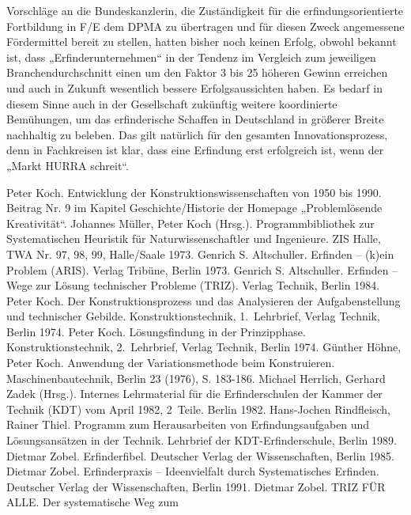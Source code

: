\documentclass[11pt,a4paper]{article}
\begin{document}
Vorschläge an die Bundeskanzlerin, die Zuständigkeit für die
erfindungsorientierte Fortbildung in F/E dem DPMA zu übertragen und für diesen
Zweck angemessene Fördermittel bereit zu stellen, hatten bisher noch keinen
Erfolg, obwohl bekannt ist, dass „Erfinderunternehmen“ in der Tendenz im
Vergleich zum jeweiligen Branchendurchschnitt einen um den Faktor 3 bis 25
höheren Gewinn erreichen und auch in Zukunft wesentlich bessere
Erfolgsaussichten haben. Es bedarf in diesem Sinne auch in der Gesellschaft
zukünftig weitere koordinierte Bemühungen, um das erfinderische Schaffen in
Deutschland in größerer Breite nachhaltig zu beleben. Das gilt natürlich für
den gesamten Innovationsprozess, denn in Fachkreisen ist klar, dass eine
Erfindung erst erfolgreich ist, wenn der „Markt HURRA schreit“.

\begin{thebibliography}{xxx}
 Peter Koch. Entwicklung der Konstruktionswissenschaften von 1950
  bis 1990. Beitrag Nr. 9 im Kapitel Geschichte/Historie der Homepage
  „Problemlösende Kreativität“.
 Johannes Müller, Peter Koch (Hrsg.). Programmbibliothek zur
  Systematischen Heuristik für Naturwissenschaftler und Ingenieure. ZIS Halle,
  TWA Nr. 97, 98, 99, Halle/Saale 1973.
 Genrich S. Altschuller. Erfinden -- (k)ein Problem (ARIS).
  Verlag Tribüne, Berlin 1973.
 Genrich S. Altschuller. Erfinden -- Wege zur Lösung technischer
  Probleme (TRIZ). Verlag Technik, Berlin 1984.
 Peter Koch. Der Konstruktionsprozess und das Analysieren der
  Aufgabenstellung und technischer Gebilde. Konstruktionstechnik,
  1.~Lehrbrief, Verlag Technik, Berlin 1974.
 Peter Koch.  Lösungsfindung in der Prinzipphase.
  Konstruktionstechnik, 2.~Lehrbrief, Verlag Technik,  Berlin 1974.
 Günther Höhne, Peter Koch. Anwendung der Variationsmethode beim
  Konstruieren. Maschinenbautechnik, Berlin 23 (1976), S. 183-186.
 Michael Herrlich, Gerhard Zadek (Hrsg.). Internes Lehrmaterial für
  die Erfinderschulen der Kammer der Technik (KDT) vom April 1982, 2~Teile.
  Berlin 1982. 
 Hans-Jochen Rindfleisch, Rainer Thiel. Programm zum Herausarbeiten
  von Erfindungsaufgaben und Lösungsansätzen in der Technik. Lehrbrief der
  KDT-Erfinderschule, Berlin 1989.
 Dietmar Zobel. Erfinderfibel. Deutscher Verlag der
  Wissenschaften, Berlin 1985.
 Dietmar Zobel. Erfinderpraxis -- Ideenvielfalt durch
  Systematisches Erfinden.  Deutscher Verlag der Wissenschaften, Berlin 1991.
 Dietmar Zobel. TRIZ FÜR ALLE. Der systematische Weg zum

\end{thebibliography}
\end{document}
